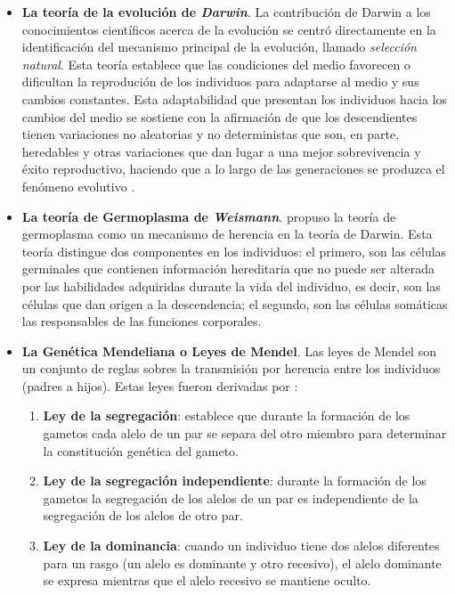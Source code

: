   \begin{itemize}
   \item \textbf{La teor\'ia de la evoluci\'on de \textit{Darwin}}. La contribuci\'on de Darwin a los conocimientos 
   cient\'ificos acerca de la evoluci\'on se centr\'o directamente en la identificaci\'on del mecanismo principal de la 
   evoluci\'on, llamado \textit{selecci\'on} \textit{natural}. Esta teor\'ia establece que las condiciones del medio 
   favorecen o dificultan la reproduci\'on de los individuos para adaptarse al medio y sus cambios constantes. Esta 
   adaptabilidad que presentan los individuos hacia los cambios del medio se sostiene con la afirmaci\'on 
   de que los descendientes tienen variaciones no aleatorias y no deterministas que son, en parte, heredables y otras
   variaciones que dan lugar a una mejor sobrevivencia y \'exito reproductivo, haciendo que a lo largo de las generaciones 
   se produzca el fen\'omeno evolutivo \cite{darwin59}.

   \item \textbf{La teor\'ia de Germoplasma de \textit{Weismann}}. \cite{Weismann93} propuso la teor\'ia de germoplasma 
   como un mecanismo de herencia en la teor\'ia de Darwin. Esta teor\'ia distingue dos componentes en los individuos: 
   el primero, son las c\'elulas germinales que contienen informaci\'on hereditaria que no puede ser alterada por las 
   habilidades adquiridas durante la vida del individuo, es decir, son las c\'elulas que dan origen a la descendencia; 
   el segundo, son las c\'elulas som\'aticas las responsables de las funciones corporales.

   \item \textbf{La Gen\'etica Mendeliana o Leyes de Mendel}. Las leyes de Mendel son un conjunto de reglas sobres la 
   transmisi\'on por herencia entre los individuos (padres a hijos). Estas leyes fueron derivadas por \cite{Mendel01}:

   \begin{enumerate}
    \item \textbf{Ley de la segregaci\'on}: establece que durante la formaci\'on de los gametos cada alelo de un par se 
    separa del otro miembro para determinar la constituci\'on gen\'etica del gameto.
    \item \textbf{Ley de la segregaci\'on independiente}: durante la formaci\'on de los gametos la segregaci\'on de los 
    alelos de un par es independiente de la segregaci\'on de los alelos de otro par.
    \item \textbf{Ley de la dominancia}: cuando un individuo tiene dos alelos diferentes para un rasgo (un alelo es 
    dominante y otro recesivo), el alelo dominante se expresa mientras que el alelo recesivo se mantiene oculto.
   \end{enumerate}


\end{itemize}
